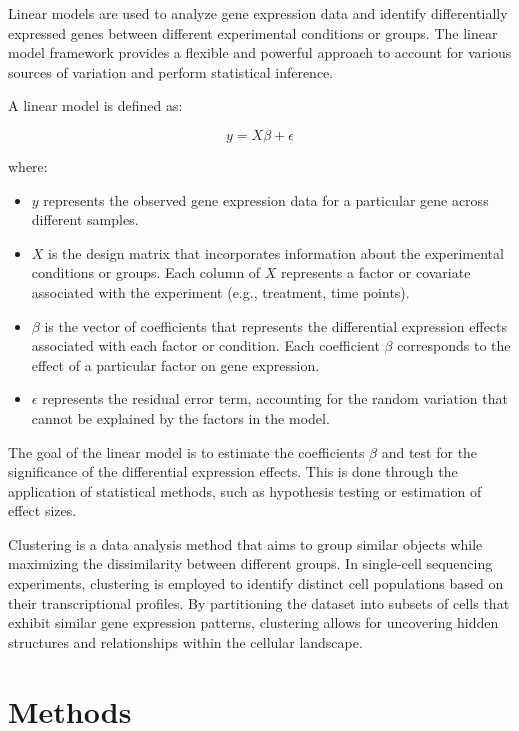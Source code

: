 \documentclass[aps,prb,twocolumn,superscriptaddress,floatfix,longbibliography]{revtex4-2}
\newif\ifptitle
\newif\ifpnumber
\newcounter{para}
\newcommand\ptitle[1]{\par\refstepcounter{para}
{\ifpnumber{\noindent\textcolor{lightgray}{\textbf{\thepara}}\indent}\fi}
{\ifptitle{\textbf{[{#1}]}}\fi}}
\begin{document}
\ptitle{Linear models} \cite{limma} Linear models are used to analyze gene expression data and identify differentially expressed genes between different experimental conditions or groups. The linear model framework provides a flexible and powerful approach to account for various sources of variation and perform statistical inference.

A linear model is defined as:

\begin{equation}
y = X\beta + \epsilon
\end{equation}

where:

\begin{itemize}
\item $y$ represents the observed gene expression data for a particular gene across different samples.
\item $X$ is the design matrix that incorporates information about the experimental conditions or groups. Each column of $X$ represents a factor or covariate associated with the experiment (e.g., treatment, time points).
\item $\beta$  is the vector of coefficients that represents the differential expression effects associated with each factor or condition. Each coefficient $\beta$ corresponds to the effect of a particular factor on gene expression.
\item $\epsilon$ represents the residual error term, accounting for the random variation that cannot be explained by the factors in the model.
\end{itemize}

The goal of the linear model is to estimate the coefficients $\beta$ and test for the significance of the differential expression effects. This is done through the application of statistical methods, such as hypothesis testing or estimation of effect sizes.

\ptitle{Cell clustering} Clustering is a data analysis method that aims to group similar objects while maximizing the dissimilarity between different groups. In single-cell sequencing experiments, clustering is employed to identify distinct cell populations based on their transcriptional profiles. By partitioning the dataset into subsets of cells that exhibit similar gene expression patterns, clustering allows for uncovering hidden structures and relationships within the cellular landscape.

\section{\label{sec:LaTeX} Methods}
\end{document}
